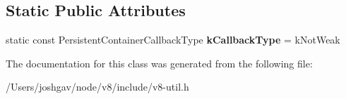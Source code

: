 \subsection*{Static Public Attributes}
\begin{DoxyCompactItemize}
\item 
static const Persistent\+Container\+Callback\+Type {\bfseries k\+Callback\+Type} = k\+Not\+Weak\hypertarget{classv8_1_1_default_global_map_traits_aca4a466a95927f10ea3fa0bff1e041d2}{}\label{classv8_1_1_default_global_map_traits_aca4a466a95927f10ea3fa0bff1e041d2}

\end{DoxyCompactItemize}


The documentation for this class was generated from the following file\+:\begin{DoxyCompactItemize}
\item 
/\+Users/joshgav/node/v8/include/v8-\/util.\+h\end{DoxyCompactItemize}
